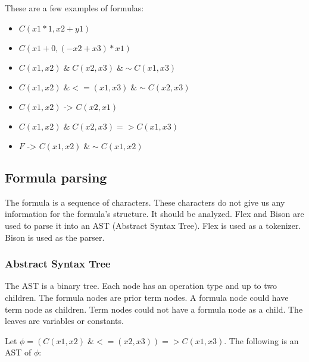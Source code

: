 \documentclass{article}
\begin{document}
	These are a few examples of formulas:
	\begin{itemize}
		\item $C(x1 * 1, x2 + y1)$
		\item $C(x1 + 0, (-x2 + x3) * x1)$
		\item $C(x1,x2) \;\&\; C(x2, x3) \;\& \sim C(x1,x3)$
		\item $C(x1,x2) \;\& <=(x1,x3) \;\& \sim C(x2,x3)$
		\item $C(x1,x2) \text{ -> } C(x2, x1)$
		\item $C(x1,x2) \;\&\; C(x2, x3) => C(x1, x3)$
		\item $F \text{ -> } C(x1,x2) \;\& \sim C(x1,x2)$
	\end{itemize}

	\subsection{Formula parsing}
	The formula is a sequence of characters. These characters do not give us any information for the formula's structure. It should be analyzed. Flex \cite{flex-tokenizer} and Bison \cite{bison-parser} are used to parse it into an AST (Abstract Syntax Tree). Flex is used as a tokenizer. Bison is used as the parser.

	\subsubsection{Abstract Syntax Tree}
	The AST is a binary tree. Each node has an operation type and up to two children. The formula nodes are prior term nodes. A formula node could have term node as children. Term nodes could not have a formula node as a child. The leaves are variables or constants.
	
	Let $\phi = (C(x1,x2) \;\& <=(x2, x3)) => C(x1, x3)$. The following is an AST of $\phi$:


	\newpage
\end{document}
